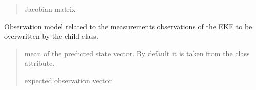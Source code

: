 \documentclass[letterpaper,10pt,english]{sphinxmanual}
\begin{document}
\begin{fulllineitems}
\begin{fulllineitems}
\begin{quote}
\begin{description}
\sphinxAtStartPar
Jacobian matrix

\end{description}\end{quote}

\end{fulllineitems}


\begin{fulllineitems}
\label{\detokenize{GFLocalization:EKF_4DOFAUV_CtVelocityMM_DVLDepthYawOM.EKF_4DOFAUV_CtVelocityMM_DVLDepthYawOM.hm}}
\pysigstartsignatures
{}
\pysigstopsignatures
\sphinxAtStartPar
Observation model related to the measurements observations of the EKF to be overwritten by the child class.
\begin{quote}\begin{description}
\sphinxAtStartPar
{} \textendash{} mean of the predicted state vector. By default it is taken from the class attribute.

\sphinxAtStartPar
expected observation vector

\end{description}\end{quote}

\end{fulllineitems}


\begin{fulllineitems}
\label{\detokenize{GFLocalization:EKF_4DOFAUV_CtVelocityMM_DVLDepthYawOM.EKF_4DOFAUV_CtVelocityMM_DVLDepthYawOM.Jhmx}}
\pysigstartsignatures
{}
\pysigstopsignatures
\end{fulllineitems}



\end{fulllineitems}
\end{document}

